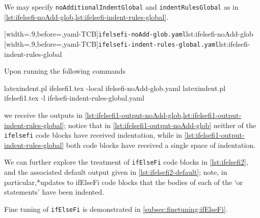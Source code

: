  \begin{example}
 We may specify \texttt{noAdditionalIndentGlobal} and \texttt{indentRulesGlobal} as in
 \cref{lst:ifelsefi-noAdd-glob,lst:ifelsefi-indent-rules-global}.

 \begin{cmhtcbraster}
  [width=.9\linewidth,before=\centering,yaml-TCB]{\texttt{ifelsefi-noAdd-glob.yaml}}{lst:ifelsefi-noAdd-glob}
  [width=.9\linewidth,before=\centering,yaml-TCB]{\texttt{ifelsefi-indent-rules-global.yaml}}{lst:ifelsefi-indent-rules-global}
 \end{cmhtcbraster}

 Upon running the following commands 

 \begin{commandshell}
latexindent.pl ifelsefi1.tex -local ifelsefi-noAdd-glob.yaml  
latexindent.pl ifelsefi1.tex -l ifelsefi-indent-rules-global.yaml  
\end{commandshell}

 we receive the outputs in
 \cref{lst:ifelsefi1-output-noAdd-glob,lst:ifelsefi1-output-indent-rules-global}; notice
 that in \cref{lst:ifelsefi1-output-noAdd-glob} neither of the \texttt{ifelsefi} code
 blocks have received indentation, while in
 \cref{lst:ifelsefi1-output-indent-rules-global} both code blocks have received a single
 space of indentation.

 \begin{cmhtcbraster}
 \end{cmhtcbraster}
 \end{example}

 \begin{example}
 We can further explore the treatment of \texttt{ifElseFi} code blocks in
 \cref{lst:ifelsefi2}, and the associated default output given in
 \cref{lst:ifelsefi2-default}; note, in particular,*{updates to
 ifElseFi code blocks} that the bodies of each of the `or statements' have been indented.%

 \begin{cmhtcbraster}[raster column skip=.1\linewidth]
 \end{cmhtcbraster}
 \end{example}

 Fine tuning of \texttt{ifElseFi} is demonstrated in \vref{subsec:finetuning:ifElseFi}.
